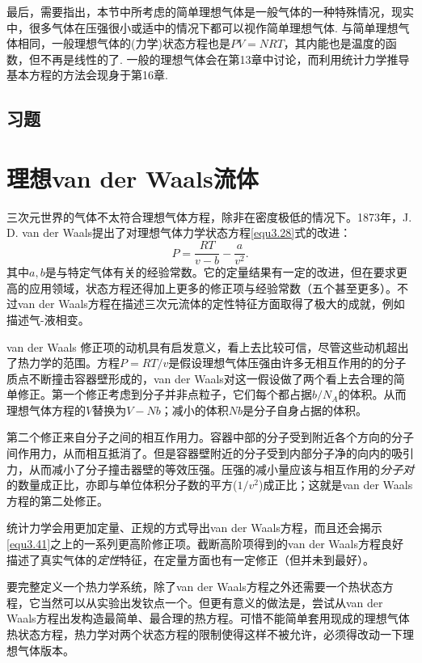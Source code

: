最后，需要指出，本节中所考虑的简单理想气体是一般气体的一种特殊情况，现实中，很多气体在压强很小或适中的情况下都可以视作简单理想气体. 与简单理想气体相同，一般理想气体的(力学)状态方程也是$PV=NRT$，其内能也是温度的函数，但不再是线性的了. 一般的理想气体会在第13章中讨论，而利用统计力学推导基本方程的方法会现身于第16章.

\subsection*{习题}

\section{理想van der Waals流体}
\label{sec3.5}
三次元世界的气体不太符合理想气体方程，除非在密度极低的情况下。1873年，J. D. van der Waals提出了对理想气体力学状态方程\eqref{equ3.28}式的改进：
\begin{equation}
    P = \frac{RT}{v - b} - \frac{a}{v^2}.
\label{equ3.41}
\end{equation}
其中$a, b$是与特定气体有关的经验常数。它的定量结果有一定的改进，但在要求更高的应用领域，状态方程还得加上更多的修正项与经验常数（五个甚至更多）。不过van der Waals方程在描述三次元流体的定性特征方面取得了极大的成就，例如描述气-液相变。

van der Waals 修正项的动机具有启发意义，看上去比较可信，尽管这些动机超出了热力学的范围。方程$P = RT/v$是假设理想气体压强由许多无相互作用的的分子质点不断撞击容器壁形成的，van der Waals对这一假设做了两个看上去合理的简单修正。第一个修正考虑到分子并非点粒子，它们每个都占据$b/N_A$的体积。从而理想气体方程的$V$替换为$V - Nb$；减小的体积$Nb$是分子自身占据的体积。

第二个修正来自分子之间的相互作用力。容器中部的分子受到附近各个方向的分子间作用力，从而相互抵消了。但是容器壁附近的分子受到内部分子净的向内的吸引力，从而减小了分子撞击器壁的等效压强。压强的减小量应该与相互作用的{\it 分子对}的数量成正比，亦即与单位体积分子数的平方($1/v^2$)成正比；这就是van der Waals方程的第二处修正。

统计力学会用更加定量、正规的方式导出van der Waals方程，而且还会揭示\eqref{equ3.41}之上的一系列更高阶修正项。截断高阶项得到的van der Waals方程良好描述了真实气体的{\it 定性}特征，在定量方面也有一定修正（但并未到最好）。

要完整定义一个热力学系统，除了van der Waals方程之外还需要一个热状态方程，它当然可以从实验出发钦点一个。但更有意义的做法是，尝试从van der Waals方程出发构造最简单、最合理的热方程。可惜不能简单套用现成的理想气体热状态方程，热力学对两个状态方程的限制使得这样不被允许，必须得改动一下理想气体版本。

